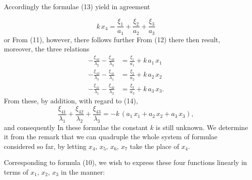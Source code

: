 Accordingly the formulae (13) yield in agreement

\[
k\,x_4 = \frac{\xi_1}{a_1} + \frac{\xi_2}{a_2} + \frac{\xi_3}{a_3}
\]
or
From (11), however, there follows further
From (12) there then result, moreover, the three relations
\[
\begin{aligned}
-\frac{\xi_{42}}{\lambda_2} - \frac{\xi_{43}}{\lambda_3} &= \frac{\xi_1}{a_1} + k\,a_1\,x_1 \\
-\frac{\xi_{43}}{\lambda_3} - \frac{\xi_{41}}{\lambda_1} &= \frac{\xi_2}{a_2} + k\,a_2\,x_2 \\
-\frac{\xi_{41}}{\lambda_1} - \frac{\xi_{42}}{\lambda_2} &= \frac{\xi_3}{a_3} + k\,a_3\,x_3.
\end{aligned}
\]
From these, by addition, with regard to (14),
\[
\frac{\xi_{41}}{\lambda_1} + \frac{\xi_{42}}{\lambda_2} + \frac{\xi_{43}}{\lambda_3} = -k\,(a_1\,x_1 + a_2\,x_2 + a_3\,x_3),
\]
and consequently
In these formulae the constant $k$ is still unknown. We determine it from the remark that we can quadruple the whole system of formulae considered so far, by letting $x_4$, $x_5$, $x_6$, $x_7$ take the place of $x_4$.

Corresponding to formula (10), we wish to express these four functions linearly in terms of $x_1$, $x_2$, $x_3$ in the manner:
